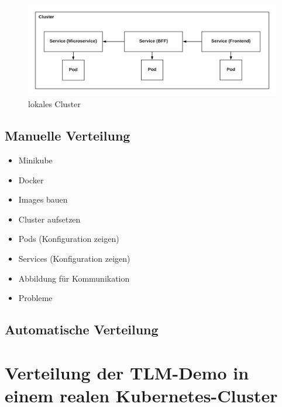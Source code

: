 \begin{figure}[h]
	\centering
	\includegraphics[width=\textwidth]{images/lokalesCluster}
	\caption{lokales Cluster}
	\label{fig:lokalesCluster}
\end{figure}

\subsection{Manuelle Verteilung}







\begin{itemize}
	\item Minikube 
	\item Docker 
	\item Images bauen
	\item Cluster aufsetzen
	\item Pods (Konfiguration zeigen)
	\item Services (Konfiguration zeigen)
	\item Abbildung für Kommunikation
	\item Probleme
\end{itemize}

\subsection{Automatische Verteilung}

\section{Verteilung der TLM-Demo in einem realen Kubernetes-Cluster}